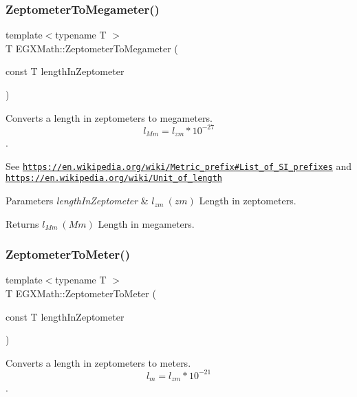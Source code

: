 \subsubsection{\texorpdfstring{Zeptometer\+To\+Megameter()}{ZeptometerToMegameter()}}
{\footnotesize\ttfamily template$<$typename T $>$ \\
T E\+G\+X\+Math\+::\+Zeptometer\+To\+Megameter (\begin{DoxyParamCaption}\item[{const T}]{length\+In\+Zeptometer }\end{DoxyParamCaption})}



Converts a length in zeptometers to megameters. \[ l_{Mm}=l_{zm} * 10^{-27} \]. 

See \href{https://en.wikipedia.org/wiki/Metric_prefix#List_of_SI_prefixes}{\tt https\+://en.\+wikipedia.\+org/wiki/\+Metric\+\_\+prefix\#\+List\+\_\+of\+\_\+\+S\+I\+\_\+prefixes} and \href{https://en.wikipedia.org/wiki/Unit_of_length}{\tt https\+://en.\+wikipedia.\+org/wiki/\+Unit\+\_\+of\+\_\+length} 
\begin{DoxyParams}{Parameters}
{\em length\+In\+Zeptometer} & $ l_{zm}\ (zm)$ Length in zeptometers. \\
\hline
\end{DoxyParams}
\begin{DoxyReturn}{Returns}
$ l_{Mm}\ (Mm)$ Length in megameters. 
\end{DoxyReturn}
\mbox{\label{group___e_g_x_math-_conversions-_length_conversions-_s_i-_zeptometer-_s_i_gaf51d88eb55e387d6ee07a02f2229be97}} 
\subsubsection{\texorpdfstring{Zeptometer\+To\+Meter()}{ZeptometerToMeter()}}
{\footnotesize\ttfamily template$<$typename T $>$ \\
T E\+G\+X\+Math\+::\+Zeptometer\+To\+Meter (\begin{DoxyParamCaption}\item[{const T}]{length\+In\+Zeptometer }\end{DoxyParamCaption})}



Converts a length in zeptometers to meters. \[ l_{m}=l_{zm} * 10^{-21} \]. 


